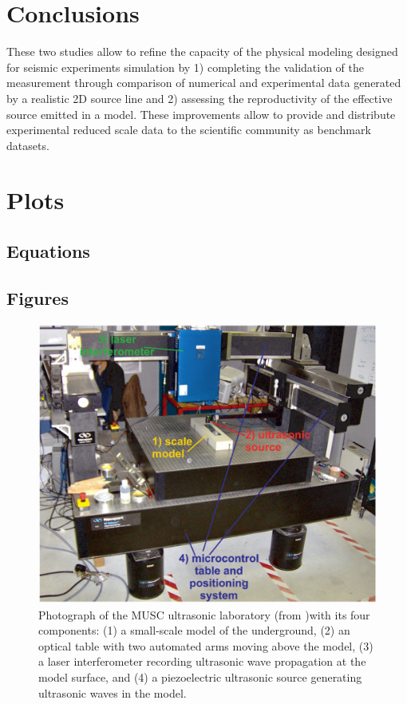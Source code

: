 \documentclass[manuscript,revised]{geophysics}
\begin{document}

\section{Conclusions}

\noindent These two studies allow to refine the capacity of the physical modeling designed for seismic experiments simulation by 1) completing the validation of the measurement through comparison of numerical and experimental data generated by a realistic 2D source line and 2) assessing the reproductivity of the effective source emitted in a model. These improvements allow to provide and distribute experimental reduced scale data to the scientific community as benchmark datasets.

\section{Plots}

\subsection*{Equations}

\subsection*{Figures}

\begin{figure}[!h]
	\centering
	\includegraphics[scale=0.4]{fig/panel_musc_bench.eps}
	\caption{Photograph of the MUSC ultrasonic laboratory (from \citet{Bretaudeau_FWI_2013} )with its four components: (1) a small-scale model of the underground, (2) an optical table with two automated arms moving above the model, (3) a laser interferometer recording ultrasonic wave propagation	at the model surface, and (4) a piezoelectric ultrasonic source generating ultrasonic waves in the model.}
	\label{panel_musc_bench}
\end{figure}
\end{document}
